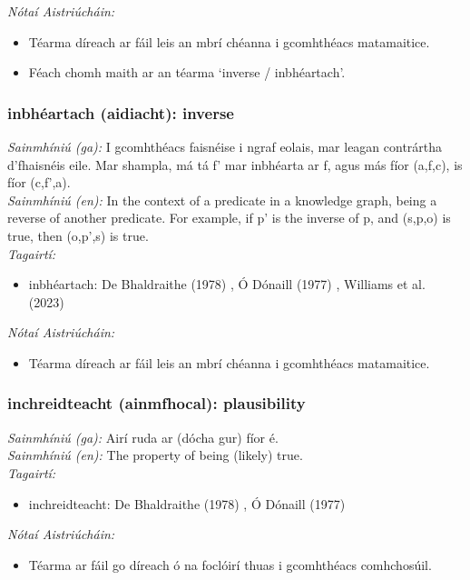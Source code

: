  \noindent \textit{Nótaí Aistriúcháin:}
\begin{itemize}
	\item Téarma díreach ar fáil leis an mbrí chéanna i gcomhthéacs matamaitice.
	\item Féach chomh maith ar an téarma `inverse / inbhéartach'.
\end{itemize}


\subsubsection*{inbhéartach (aidiacht): inverse}
 \noindent \textit{Sainmhíniú (ga):} I gcomhthéacs faisnéise i ngraf eolais, mar leagan contrártha d'fhaisnéis eile. Mar shampla, má tá f' mar inbhéarta ar f, agus más fíor (a,f,c), is fíor (c,f',a).
\\
 \noindent \textit{Sainmhíniú (en):} In the context of a predicate in a knowledge graph, being a reverse of another predicate. For example, if p' is the inverse of p, and (s,p,o) is true, then (o,p',s) is true.
\\
 \noindent \textit{Tagairtí:}
\begin{itemize}
	\item inbhéartach: De Bhaldraithe (1978) \cite{de-bhaldraithe}, Ó Dónaill (1977) \cite{odonaill}, Williams et al. (2023) \cite{storchiste}
\end{itemize}

 \noindent \textit{Nótaí Aistriúcháin:}
\begin{itemize}
	\item Téarma díreach ar fáil leis an mbrí chéanna i gcomhthéacs matamaitice.
\end{itemize}


\subsubsection*{inchreidteacht (ainmfhocal): plausibility}
 \noindent \textit{Sainmhíniú (ga):} Airí ruda ar (dócha gur) fíor é.
\\
 \noindent \textit{Sainmhíniú (en):} The property of being (likely) true.
\\
 \noindent \textit{Tagairtí:}
\begin{itemize}
	\item inchreidteacht: De Bhaldraithe (1978) \cite{de-bhaldraithe}, Ó Dónaill (1977) \cite{odonaill}
\end{itemize}

 \noindent \textit{Nótaí Aistriúcháin:}
\begin{itemize}
	\item Téarma ar fáil go díreach ó na foclóirí thuas i gcomhthéacs comhchosúil.
\end{itemize}



